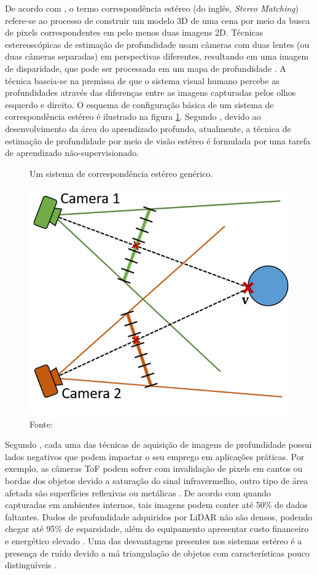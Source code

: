 De acordo com , o termo correspondência estéreo (do inglês, \textit{Stereo Matching}) refere-se ao processo de construir um modelo 3D de uma cena por meio da busca de pixels correspondentes em pelo menos duas imagens 2D. Técnicas estereoscópicas de estimação de profundidade usam câmeras com duas lentes (ou duas câmeras separadas) em perspectivas diferentes, resultando em uma imagem de disparidade, que pode ser processada em um mapa de profundidade \cite{castellano2023performance}. A técnica baseia-se na premissa de que o sistema visual humano percebe as profundidades através das diferenças entre as imagens capturadas pelos olhos esquerdo e direito. O esquema de configuração básica de um sistema de correspondência estéreo é ilustrado na figura \ref{fig:stereo}. Segundo , devido ao desenvolvimento da área do aprendizado profundo, atualmente, a técnica de estimação de profundidade por meio de visão estéreo é formulada por uma tarefa de aprendizado não-supervisionado.

\begin{figure}[h!]
    \centering
    \caption{Um sistema de correspondência estéreo genérico. }
    \includegraphics[width=.6\textwidth]{fig/stereo_cams.png}
    \caption*{Fonte: }
    \label{fig:stereo}
\end{figure}

Segundo \cite{castellano2023performance}, cada uma das técnicas de aquisição de imagens de profundidade possui lados negativos que podem impactar o seu emprego em aplicações práticas. Por exemplo, as câmeras ToF  podem sofrer com invalidação de pixels em cantos ou bordas dos objetos devido a saturação do sinal infravermelho, outro tipo de área afetada são superfícies reflexivas ou metálicas \cite{zollhofer2019commodity}. De acordo com  quando capturadas em ambientes internos, tais imagens podem conter até 50\% de dados faltantes. Dados de profundidade adquiridos por LiDAR não são densos, podendo chegar até 95\% de esparsidade, além do equipamento apresentar custo financeiro e energético elevado \cite{khan2020deep} \cite{hu2022deep}. Uma das desvantagens presentes nos sistemas estéreo é a presença de ruído devido a má triangulação de objetos com características pouco distinguíveis \cite{castellano2023performance}.


